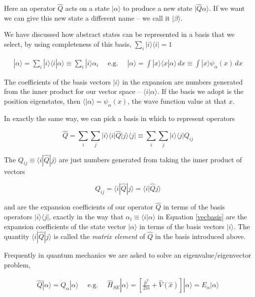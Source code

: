 Here an operator $\hat{Q}$ acts on a state $| \alpha \rangle$ to produce a new
state $| \hat{Q}\alpha \rangle$. If we want we can give this new state
a different name -- we call it $| \beta \rangle$. 

We have discussed how abstract states can be represented in a basis that we
select, by using completeness of this basis, $\sum_i | i \rangle \langle
i | = 1$

\begin{align} \label{vecbasis}
|\alpha \rangle = \sum_{i}^{} | i \rangle \langle i | \alpha \rangle \equiv
\sum_{i}^{} |i\rangle \alpha_i \quad \text{ e.g. } \quad |\alpha \rangle = \int
|x\rangle \langle x | \alpha \rangle \, dx \equiv \int |x\rangle \psi_\alpha(x)
\, dx 
\end{align} \vspace{3px}

The coefficients of the basis vectors $|i\rangle$ in the expansion are numbers
generated from the inner product for our vector space -- $\langle i | \alpha
\rangle$. If the basis we adopt is the position eigenstates, then $\langle
| \alpha \rangle = \psi_\alpha(x)$, the wave function value at that $x$. 

In exactly the same way, we can pick a basis in which to represent operators 

\[
\hat{Q} = \sum_{i}^{} \sum_{j}^{} |i\rangle \langle i | \hat{Q} | j \rangle
\langle j | \equiv \sum_{i}^{} \sum_{j}^{} |i\rangle \langle j | Q_{ij}
\] \vspace{3px}

The $Q_{ij} \equiv \langle i | \hat{Q} | j\rangle$ are just numbers generated
from taking the inner product of vectors 

\[
  Q_{ij} = \langle i | \hat{Q} | j\rangle = \langle i | \hat{Q}j \rangle 
\] \vspace{3px}

and are the expansion coefficients of our operator $\hat{Q}$ in terms of the
basis operators $|i\rangle \langle j |$, exactly in the way that $\alpha_i
\equiv \langle i | \alpha \rangle$ in Equation \ref{vecbasis} are the expansion
coefficients of the state vector $|\alpha \rangle$ in terms of the basis
vectors $|i\rangle$. The quantity $\langle i | \hat{Q} | j\rangle $ is called
the \textit{matrix element} of $\hat{Q}$ in the basis introduced above. 


Frequently in quantum mechanics we are asked to solve an eigenvalue/eigenvector
problem, 

\begin{align} \label{eigenvalproblem}
  \hat{Q}|\alpha\rangle = Q_\alpha |\alpha\rangle \quad \text{ e.g. } \quad
  \hat{H}_{SE}|\alpha\rangle = \left[ \frac{\hat{p}^2}{2m}
  + \hat{V}(\hat{x})\right] |\alpha\rangle = E_\alpha |\alpha\rangle
\end{align}\vspace{3px}

